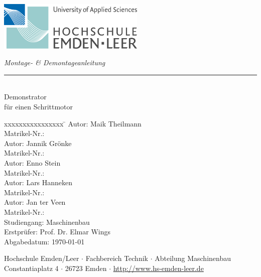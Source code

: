 %
%

\begin{titlepage}
    
    \begin{flushleft} 
        \includegraphics[width=7cm]{General/Logo_HS_Emden_Leer.jpg}
    \end{flushleft} 
    
    \begin{flushright}
        \vspace{2cm}
        \LARGE \textsl{Montage- \& Demontageanleitung}\\
        \rule{0.6\textwidth}{0.4pt} ~\\
        \vspace{0.5cm}
        \textsf{\LARGE Demonstrator}\\
        \textsf{\LARGE für einen Schrittmotor}
    \end{flushright}
    
    \vspace{3cm}
    \large
    \begin{tabbing}
       xxxxxxxxxxxxxxxx \= \kill
       Autor:			\> Maik Theilmann \\
       Matrikel-Nr.:	 \\
       Autor:			\> Jannik Grönke \\
       Matrikel-Nr.:	 \\
       Autor:			\> Enno Stein \\
       Matrikel-Nr.:	 \\
       Autor:			\> Lars Hanneken \\
       Matrikel-Nr.:	 \\
       Autor:			\> Jan ter Veen \\
       Matrikel-Nr.:	 \\
       Studiengang: \> Maschinenbau \\ [0.5cm]
       Erstprüfer: \> Prof. Dr. Elmar Wings \\
        Abgabedatum: \> \today \\
    \end{tabbing}
    
    \vspace{3cm}
    \small
    \begin{center}
        Hochschule Emden/Leer $\cdot$ 
        Fachbereich Technik $\cdot$ 
        Abteilung Maschinenbau \\
        Constantiaplatz 4 $\cdot$ 
        26723 Emden $\cdot$ 
        \url{http://www.hs-emden-leer.de}
    \end{center}
    
\end{titlepage}
